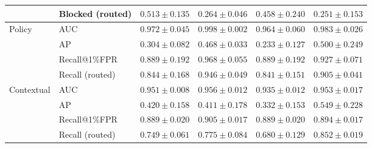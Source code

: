 \begin{table}[t]
{\begin{tabular}{llcccc}
 & Blocked (routed) & $0.513\pm0.135$ & $0.264\pm0.046$ & $0.458\pm0.240$ & $0.251\pm0.153$ \\
\midrule
\multirow{4}{*}{Policy} & AUC & $0.972\pm0.045$ & $0.998\pm0.002$ & $0.964\pm0.060$ & $0.983\pm0.026$ \\
 & AP & $0.304\pm0.082$ & $0.468\pm0.033$ & $0.233\pm0.127$ & $0.500\pm0.249$ \\
 & Recall@1\%FPR & $0.889\pm0.192$ & $0.968\pm0.055$ & $0.889\pm0.192$ & $0.927\pm0.071$ \\
 & Recall (routed) & $0.844\pm0.168$ & $0.946\pm0.049$ & $0.841\pm0.151$ & $0.905\pm0.041$ \\
\midrule
\multirow{4}{*}{Contextual} & AUC & $0.951\pm0.008$ & $0.956\pm0.012$ & $0.935\pm0.012$ & $0.953\pm0.017$ \\
 & AP & $0.420\pm0.158$ & $0.411\pm0.178$ & $0.332\pm0.153$ & $0.549\pm0.228$ \\
 & Recall@1\%FPR & $0.889\pm0.020$ & $0.905\pm0.017$ & $0.889\pm0.020$ & $0.894\pm0.017$ \\
 & Recall (routed) & $0.749\pm0.061$ & $0.775\pm0.084$ & $0.680\pm0.129$ & $0.852\pm0.019$ \\
\bottomrule
\end{tabular}}
\end{table}
